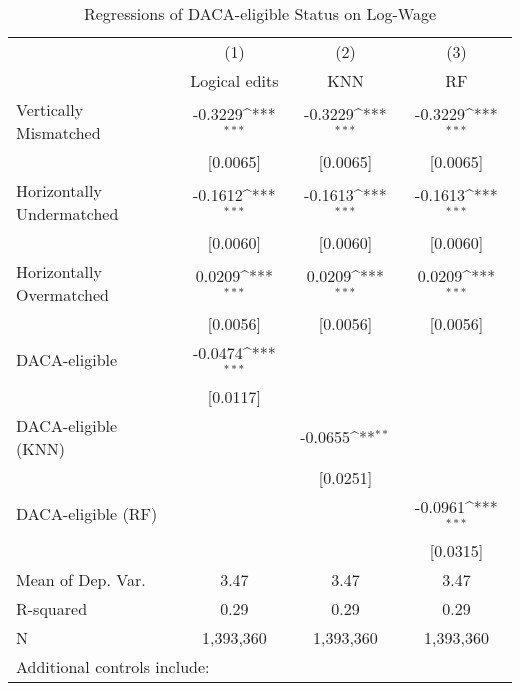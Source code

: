 \begin{table}[htbp]\centering
\def\sym#1{\ifmmode^{#1}\else\(^{#1}\)\fi}
\caption{Regressions of DACA-eligible Status on Log-Wage}
\begin{tabular}{l*{3}{c}}
\toprule
                    &\multicolumn{1}{c}{(1)}         &\multicolumn{1}{c}{(2)}         &\multicolumn{1}{c}{(3)}         \\
                    &Logical edits         &         KNN         &          RF         \\
\midrule
Vertically Mismatched&     -0.3229\sym{***}&     -0.3229\sym{***}&     -0.3229\sym{***}\\
                    &    [0.0065]         &    [0.0065]         &    [0.0065]         \\
\addlinespace
Horizontally Undermatched&     -0.1612\sym{***}&     -0.1613\sym{***}&     -0.1613\sym{***}\\
                    &    [0.0060]         &    [0.0060]         &    [0.0060]         \\
\addlinespace
Horizontally Overmatched&      0.0209\sym{***}&      0.0209\sym{***}&      0.0209\sym{***}\\
                    &    [0.0056]         &    [0.0056]         &    [0.0056]         \\
\addlinespace
DACA-eligible       &     -0.0474\sym{***}&                     &                     \\
                    &    [0.0117]         &                     &                     \\
\addlinespace
DACA-eligible (KNN) &                     &     -0.0655\sym{**} &                     \\
                    &                     &    [0.0251]         &                     \\
\addlinespace
DACA-eligible (RF)  &                     &                     &     -0.0961\sym{***}\\
                    &                     &                     &    [0.0315]         \\
\midrule
Mean of Dep. Var.   &        3.47         &        3.47         &        3.47         \\
R-squared           &        0.29         &        0.29         &        0.29         \\
N                   &   1,393,360         &   1,393,360         &   1,393,360         \\
\bottomrule
\multicolumn{4}{l}{\footnotesize Additional controls include:}\\

\end{tabular}
\end{table}

